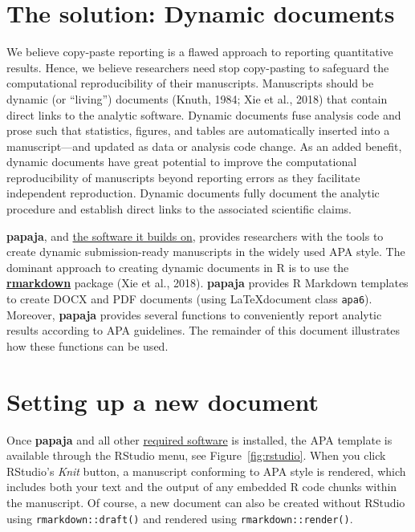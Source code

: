 \documentclass[
  ,man,floatsintext]{apa6}
\begin{document}
\hypertarget{the-solution-dynamic-documents}{%
\section{The solution: Dynamic documents}\label{the-solution-dynamic-documents}}

We believe copy-paste reporting is a flawed approach to reporting quantitative results.
Hence, we believe researchers need stop copy-pasting to safeguard the computational reproducibility of their manuscripts.
Manuscripts should be dynamic (or \enquote{living}) documents (Knuth, 1984; Xie et al., 2018) that contain direct links to the analytic software.
Dynamic documents fuse analysis code and prose such that statistics, figures, and tables are automatically inserted into a manuscript---and updated as data or analysis code change.
As an added benefit, dynamic documents have great potential to improve the computational reproducibility of manuscripts beyond reporting errors as they facilitate independent reproduction.
Dynamic documents fully document the analytic procedure and establish direct links to the associated scientific claims.

\textbf{papaja}, and \href{http://frederikaust.com/papaja_man/introduction.html\#document-compilation}{the software it builds on}, provides researchers with the tools to create dynamic submission-ready manuscripts in the widely used APA style.
The dominant approach to creating dynamic documents in R is to use the \href{https://rmarkdown.rstudio.com/}{\textbf{rmarkdown}} package (Xie et al., 2018).
\textbf{papaja} provides R Markdown templates to create DOCX and PDF documents (using \LaTeX document class \texttt{apa6}).
Moreover, \textbf{papaja} provides several functions to conveniently report analytic results according to APA guidelines.
The remainder of this document illustrates how these functions can be used.

\hypertarget{setting-up-a-new-document}{%
\section{Setting up a new document}\label{setting-up-a-new-document}}

Once \textbf{papaja} and all other \href{http://frederikaust.com/papaja_man/introduction.html\#software-requirements}{required software} is installed, the APA template is available through the RStudio menu, see Figure~\ref{fig:rstudio}.
When you click RStudio's \emph{Knit} button, a manuscript conforming to APA style is rendered, which includes both your text and the output of any embedded R code chunks within the manuscript.
Of course, a new document can also be created without RStudio using \texttt{rmarkdown::draft()} and rendered using \texttt{rmarkdown::render()}.
\end{document}
